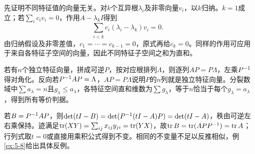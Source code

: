 \label{der:5-2}
先证明不同特征值的向量无关。对$k$个互异根$\lambda_i$及非零向量$v_i$，以$k$归纳。$k=1$成立；若$\sum_i c_iv_i=0$，作用$A-\lambda_kI$得到
\[\sum_{i<k}c_i(\lambda_i-\lambda_k)v_i=0.\]
由归纳假设及非零差值，$c_1=\cdots=c_{k-1}=0$，原式再给$c_k=0$。同样的作用可应用于来自各特征子空间的向量，因此不同特征子空间之和为直和。

若有$n$个独立特征向量，拼成可逆$P$，按对应根排列$\Lambda$，则逐列$AP=P\Lambda$，左乘$P^{-1}$得对角化。反向若$P^{-1} AP=\Lambda$，$AP=P\Lambda$说明$P$的$n$列就是独立特征向量。分裂数域中$\sum a_\lambda=n$且$g_\lambda\le a_\lambda$，各特征空间直和维数为$\sum g_\lambda$，等于$n$恰当于每个$g_\lambda=a_\lambda$，得到所有等价判据。

若$B=P^{-1} AP$，则$\det(tI-B)=\det(P^{-1}(tI-A)P)=\det(tI-A)$，秩由可逆左右乘保持。迹满足$\operatorname{tr}(XY)=\sum_{ij}x_{ij}y_{ji}=\operatorname{tr}(YX)$，故$\operatorname{tr} B=\operatorname{tr}(APP^{-1})=\operatorname{tr} A$；行列式取$t=0$或直接用乘积公式得到不变。相同的不变量不足以反推相似，例\ref{ex:5-8}给出具体反例。
